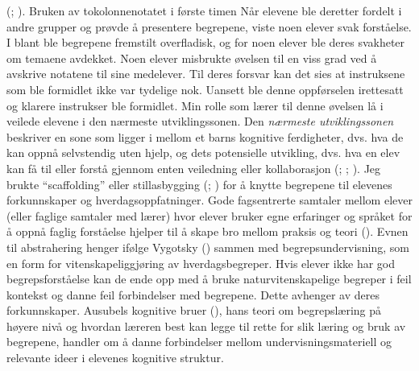 \documentclass[main.tex]{subfiles}
\begin{document}
(; ). Bruken av tokolonnenotatet i første timen 
\newline
\newline
Når elevene ble deretter fordelt i andre grupper og prøvde å presentere begrepene, viste noen elever 
svak forståelse. I blant ble begrepene fremstilt overfladisk, og for noen elever ble deres svakheter 
om temaene avdekket. Noen elever misbrukte øvelsen til en viss grad ved å avskrive notatene til sine 
medelever. Til deres forsvar kan det sies at instruksene som ble formidlet ikke var tydelige nok. 
Uansett ble denne oppførselen irettesatt og klarere instrukser ble formidlet.
\newline
\newline
Min rolle som lærer til denne øvelsen lå i veilede elevene i den nærmeste utviklingssonen.
Den \emph{nærmeste utviklingssonen} beskriver en sone som ligger i mellom et barns kognitive 
ferdigheter, dvs. hva de kan oppnå selvstendig uten hjelp, og dets potensielle utvikling, dvs. 
hva en elev kan få til eller forstå gjennom enten veiledning eller kollaborasjon 
(; ; ). Jeg brukte ``scaffolding'' 
eller stillasbygging (; ) for å knytte begrepene til elevenes 
forkunnskaper og hverdagsoppfatninger. Gode fagsentrerte samtaler mellom elever (eller faglige samtaler 
med lærer) hvor elever bruker egne erfaringer og språket for å oppnå faglig forståelse hjelper til å 
skape bro mellom praksis og teori ().
\newline
\newline
Evnen til abstrahering henger ifølge Vygotsky () sammen med begrepsundervisning, som en
form for vitenskapeliggjøring av hverdagsbegreper. Hvis elever ikke har god begrepsforståelse
kan de ende opp med å bruke naturvitenskapelige begreper i feil kontekst og danne feil 
forbindelser med begrepene. Dette avhenger av deres forkunnskaper. Ausubels kognitive bruer 
(), hans teori om begrepslæring på høyere nivå og hvordan læreren best kan 
legge til rette for slik læring og bruk av begrepene, handler om å danne forbindelser mellom 
undervisningsmateriell og relevante ideer i elevenes kognitive struktur.
\end{document}
